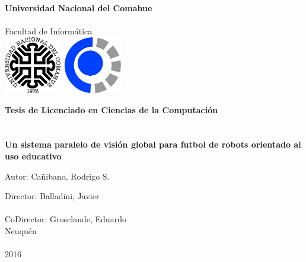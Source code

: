 
\titlepage

\begin{center}
\ \\
\ \\
\vspace{-1cm}
 

\ \\

\vspace{0.5cm}
{\Large{\bf \sc Universidad Nacional del Comahue}}\\

\ \\
{\Large { \sc Facultad de Informática}}\\

\vspace{-2.5cm}
\mbox{\hspace{-1cm}\includegraphics[width=2.5cm,height=2.5cm]{logos/unc.png}\hspace{13cm} \includegraphics[width=2.5cm,height=2.5cm]{logos/fai.png}}


\vspace{6cm}

{\Large {\bf\sc Tesis de Licenciado en Ciencias de la Computación}}\\
\ \\
\ \\
{\LARGE {\bf Un sistema paralelo de visión global para futbol de robots
	orientado al uso educativo}}\\
\vspace{3cm}

{\Large Autor: Cañibano, Rodrigo S.}\\
\vspace{2cm}

{\Large Director: Balladini, Javier}\\
\ \\
{\Large CoDirector: Grosclaude, Eduardo}\\

\vfill
{\Large {\sc Neuquén}\hspace{6cm}{\sc Argentina}}\\
\ \\

{\Large 2016}\\

\end{center}

\pagebreak


